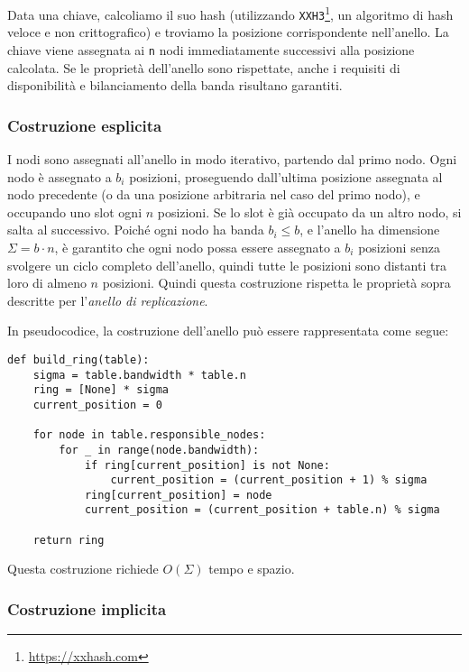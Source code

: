 Data una chiave, calcoliamo il suo hash (utilizzando \texttt{XXH3}\footnote{\url{https://xxhash.com}}, un algoritmo di hash veloce e non crittografico) e troviamo la posizione corrispondente nell'anello.
La chiave viene assegnata ai \texttt{n} nodi immediatamente successivi alla posizione calcolata.
Se le proprietà dell'anello sono rispettate, anche i requisiti di disponibilità e bilanciamento della banda risultano garantiti.

\subsubsection{Costruzione esplicita}
\label{subsubsec:costruzione-esplicita}

I nodi sono assegnati all'anello in modo iterativo, partendo dal primo nodo.
Ogni nodo è assegnato a $b_i$ posizioni, proseguendo dall'ultima posizione assegnata al nodo precedente (o da una posizione arbitraria nel caso del primo nodo), e occupando uno slot ogni $n$ posizioni.
Se lo slot è già occupato da un altro nodo, si salta al successivo.
Poiché ogni nodo ha banda $b_i \leq b$, e l'anello ha dimensione $\Sigma = b \cdot n$, è garantito che ogni nodo possa essere assegnato a $b_i$ posizioni senza svolgere un ciclo completo dell'anello, quindi tutte le posizioni sono distanti tra loro di almeno $n$ posizioni.
Quindi questa costruzione rispetta le proprietà sopra descritte per l'\emph{anello di replicazione}.

\begin{samepage}
\noindent In pseudocodice, la costruzione dell'anello può essere rappresentata come segue:
\begin{verbatim}
def build_ring(table):
    sigma = table.bandwidth * table.n
    ring = [None] * sigma
    current_position = 0

    for node in table.responsible_nodes:
        for _ in range(node.bandwidth):
            if ring[current_position] is not None:
                current_position = (current_position + 1) % sigma
            ring[current_position] = node
            current_position = (current_position + table.n) % sigma

    return ring
\end{verbatim}
\end{samepage}

Questa costruzione richiede $O(\Sigma)$ tempo e spazio.

\subsubsection{Costruzione implicita}
\label{subsubsec:costruzione-implicita}

